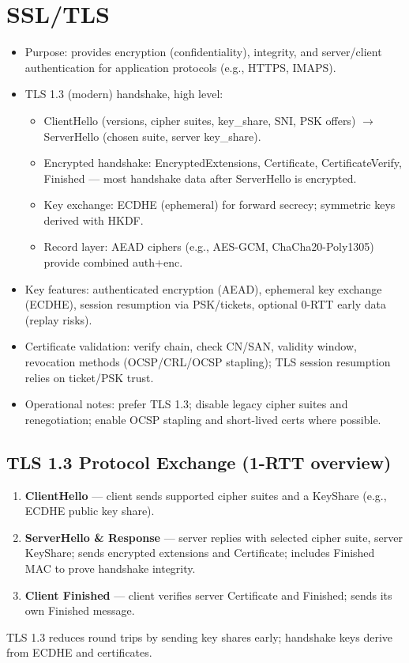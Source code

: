 \documentclass[12pt]{article}
\begin{document}
\section{SSL/TLS}
\begin{itemize}
  \item Purpose: provides encryption (confidentiality), integrity, and server/client authentication for application protocols (e.g., HTTPS, IMAPS).
  \item TLS 1.3 (modern) handshake, high level:
    \begin{itemize}
      \item ClientHello (versions, cipher suites, key\_share, SNI, PSK offers) $\to$ ServerHello (chosen suite, server key\_share).
      \item Encrypted handshake: EncryptedExtensions, Certificate, CertificateVerify, Finished --- most handshake data after ServerHello is encrypted.
      \item Key exchange: ECDHE (ephemeral) for forward secrecy; symmetric keys derived with HKDF.
      \item Record layer: AEAD ciphers (e.g., AES-GCM, ChaCha20-Poly1305) provide combined auth+enc.
    \end{itemize}
  \item Key features: authenticated encryption (AEAD), ephemeral key exchange (ECDHE), session resumption via PSK/tickets, optional 0-RTT early data (replay risks).
  \item Certificate validation: verify chain, check CN/SAN, validity window, revocation methods (OCSP/CRL/OCSP stapling); TLS session resumption relies on ticket/PSK trust.
  \item Operational notes: prefer TLS 1.3; disable legacy cipher suites and renegotiation; enable OCSP stapling and short-lived certs where possible.
\end{itemize}

\subsection{TLS 1.3 Protocol Exchange (1-RTT overview)}
\begin{enumerate}[label=\arabic*.]
  \item \textbf{ClientHello} --- client sends supported cipher suites and a KeyShare (e.g., ECDHE public key share).
  \item \textbf{ServerHello \& Response} --- server replies with selected cipher suite, server KeyShare; sends encrypted extensions and Certificate; includes Finished MAC to prove handshake integrity.
  \item \textbf{Client Finished} --- client verifies server Certificate and Finished; sends its own Finished message.
\end{enumerate}
TLS 1.3 reduces round trips by sending key shares early; handshake keys derive from ECDHE and certificates.
\end{document}
